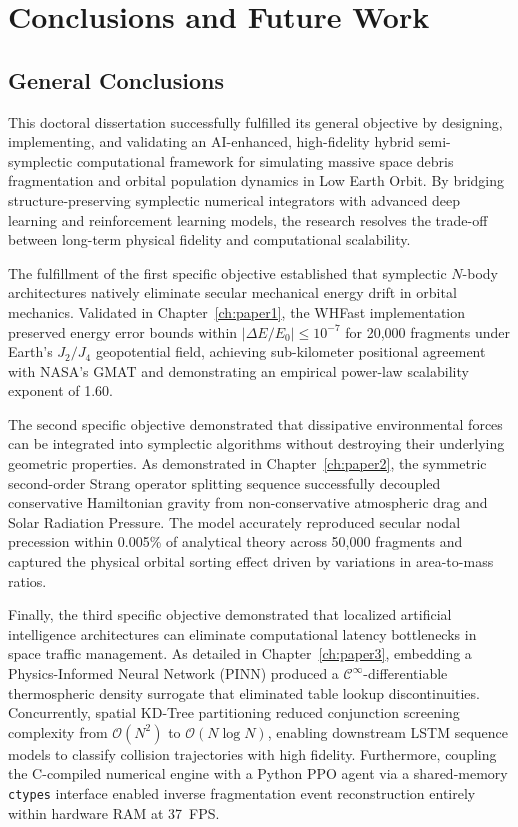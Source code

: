 \chapter{Conclusions and Future Work}
\label{ch:conclusions}

\section{General Conclusions}
This doctoral dissertation successfully fulfilled its general objective by designing, implementing, and validating an AI-enhanced, high-fidelity hybrid semi-symplectic computational framework for simulating massive space debris fragmentation and orbital population dynamics in Low Earth Orbit. By bridging structure-preserving symplectic numerical integrators with advanced deep learning and reinforcement learning models, the research resolves the trade-off between long-term physical fidelity and computational scalability.

The fulfillment of the first specific objective established that symplectic $N$-body architectures natively eliminate secular mechanical energy drift in orbital mechanics. Validated in Chapter~\ref{ch:paper1}, the WHFast implementation preserved energy error bounds within $\vert{}\Delta E/E_0\vert{} \le 10^{-7}$ for 20,000 fragments under Earth's $J_2/J_4$ geopotential field, achieving sub-kilometer positional agreement with NASA's GMAT and demonstrating an empirical power-law scalability exponent of 1.60.

The second specific objective demonstrated that dissipative environmental forces can be integrated into symplectic algorithms without destroying their underlying geometric properties. As demonstrated in Chapter~\ref{ch:paper2}, the symmetric second-order Strang operator splitting sequence successfully decoupled conservative Hamiltonian gravity from non-conservative atmospheric drag and Solar Radiation Pressure. The model accurately reproduced secular nodal precession within 0.005\% of analytical theory across 50,000 fragments and captured the physical orbital sorting effect driven by variations in area-to-mass ratios.

Finally, the third specific objective demonstrated that localized artificial intelligence architectures can eliminate computational latency bottlenecks in space traffic management. As detailed in Chapter~\ref{ch:paper3}, embedding a Physics-Informed Neural Network (PINN) produced a $\mathcal{C}^\infty$-differentiable thermospheric density surrogate that eliminated table lookup discontinuities. Concurrently, spatial KD-Tree partitioning reduced conjunction screening complexity from $\mathcal{O}(N^2)$ to $\mathcal{O}(N \log N)$, enabling downstream LSTM sequence models to classify collision trajectories with high fidelity. Furthermore, coupling the C-compiled numerical engine with a Python PPO agent via a shared-memory \texttt{ctypes} interface enabled inverse fragmentation event reconstruction entirely within hardware RAM at 37~FPS.

